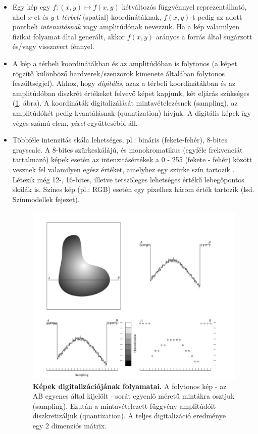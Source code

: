 \documentclass[12pt]{article}
\theoremstyle{plain}
\begin{document}
\begin{itemize}

\item Egy kép egy $f: (x,y) \mapsto f(x,y)$ kétváltozós függvénnyel reprezentálható, ahol $x$-et és $y$-t \textit{térbeli} (spatial) koordinátáknak, $f(x,y)$-t pedig  az adott pontbeli  \textit{intenzitásnak} vagy amplitúdónak nevezzük. Ha a kép valamilyen fizikai folyamat által generált, akkor $f(x,y)$ arányos a forrás által sugárzott és/vagy visszavert fénnyel. 

\item A kép a térbeli koordinátákban és az amplitúdóban is folytonos (a képet rögzítő különböző hardverek/szenzorok kimenete általában folytonos feszültségjel). Ahhoz, hogy \textit{digitális}, azaz a térbeli koordinátákban és az amplitúdóban diszkrét értékeket felvevő képet kapjunk, két eljárás szükséges (\ref{fig:sampling}. ábra). A koordináták digitalizálását mintavételezésnek (sampling), az amplitúdókét pedig kvantálásnak (quantization) hívjuk. A digitális képek így véges számú elem, \textit{pixel} együtteséből áll.

\item Többféle intenzitás skála lehetséges, pl.: bináris (fekete-fehér), 8-bites grayscale. A 8-bites szürkeskálájú, és monokromatikus (egyféle frekvenciát tartalmazó) képek esetén az intenzitásértékek a 0 - 255 (fekete - fehér) között vesznek fel valamilyen egész értéket, amelyhez egy szürke szín tartozik \cite{grayscale}. Létezik még 12-, 16-bites, illetve tetszőleges lehetséges értékű lebegőpontos skálák is. Színes kép (pl.: RGB) esetén egy pixelhez három érték tartozik (lsd. Színmodellek fejezet).  




\begin{figure}[H]
    \begin{center}
    \includegraphics[width=0.75\linewidth]{media/sampling.JPG}
    \caption{\textbf{Képek digitalizációjának folyamatai.} A folytonos kép - az AB egyenes által kijelölt - sorát egyenlő méretű mintákra osztjuk (sampling). Ezután a mintavételezett függvény amplitúdóit diszkretizáljuk (quantization). A teljes digitalizáció eredménye egy 2 dimenziós mátrix.} 
    \label{fig:sampling}
    \end{center}
\end{figure}


\end{itemize}
\end{document}

